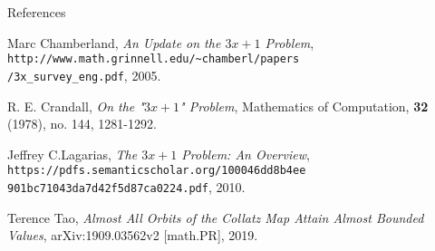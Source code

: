 \documentclass[hyperref={colorlinks,allcolors=black}]{beamer}
\begin{document}

\begin{frame}{References}
\begin{thebibliography}{4}

 Marc Chamberland, 
    \textit{An Update on the $3x+1$ Problem},
        \texttt{http://www.math.grinnell.edu/\~{}chamberl/papers\\
        /3x\_survey\_eng.pdf},
    2005.

 R. E. Crandall, \textit{On the "$3x+1$" Problem},
    Mathematics of Computation, \textbf{32} (1978), no. 144, 1281-1292.

 Jeffrey C.Lagarias, 
    \textit{The $3x+1$ Problem: An Overview},
    \texttt{https://pdfs.semanticscholar.org/100046dd8b4ee\\
        901bc71043da7d42f5d87ca0224.pdf},
    2010.

 Terence Tao, \textit{Almost All Orbits of the Collatz Map Attain
    Almost Bounded Values}, arXiv:1909.03562v2 [math.PR], 2019.

\end{thebibliography}
\end{frame}
\end{document}

